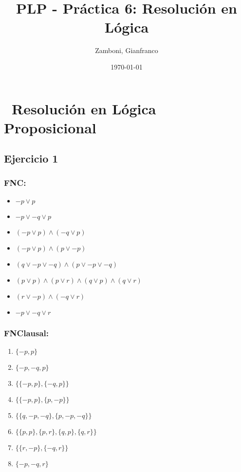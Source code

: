 \documentclass[10pt,a4paper]{article}
\begin{document}
  \title{PLP - Práctica 6: Resolución en Lógica}

  \date{\today}

  \author{Zamboni, Gianfranco}

  \maketitle
  \setcounter{page}{1}


\section*{\ Resolución en Lógica Proposicional}
\subsection{Ejercicio 1}
    \subsubsection{FNC:}
    \begin{itemize}
    \item $-p \lor p$
    \item $-p \lor -q \lor p$
    \item $(-p \lor p) \land (-q \lor p)$
    \item $(-p \lor p) \land (p \lor -p)$
    \item $(q \lor -p \lor -q) \land (p \lor -p \lor -q)$
    \item $(p \lor p) \land (p \lor r) \land (q \lor p) \land (q \lor r)$
    \item $(r \lor -p) \land (-q \lor r)$
    \item $-p \lor -q \lor r$
    \end{itemize}
    \subsubsection{FNClausal:}
    \begin{enumerate}
    \item $\{-p, p\}$
    \item $\{-p, -q, p\}$
    \item $\{\{-p, p\},\{-q, p\}\}$
    \item $\{\{-p, p\}, \{p, -p\}\}$
    \item $\{\{q, -p, -q\}, \{p, -p, -q\}\}$
    \item $\{\{p, p\}, \{p, r\}, \{q, p\}, \{q, r\}\}$
    \item $\{\{r, -p\}, \{-q, r\}\}$
    \item $\{-p, -q, r\}$
    \end{enumerate}
\end{document}
